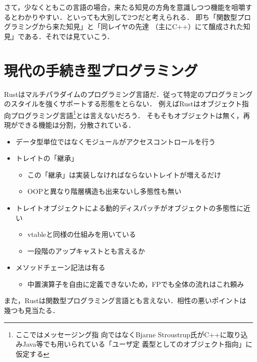 さて，少なくともこの言語の場合，来たる知見の方角を意識しつつ機能を咀嚼するとわかりやすい．といっても大別して2つだと考えられる．
即ち「関数型プログラミングから来た知見」と「同レイヤの先達 （主にC++）にて醸成された知見」である．それでは見ていこう．

\section{現代の手続き型プログラミング}
Rustはマルチパラダイムのプログラミング言語だ．従って特定のプログラミングのスタイルを強くサポートする形態をとらない．
例えばRustはオブジェクト指向プログラミング言語\footnote{ここではメッセージング指
  向ではなくBjarne Stroustrup氏がC++に取り込みJava等でも用いられている「ユーザ定
  義型としてのオブジェクト指向」に仮定する}とは言えないだろう．
そもそもオブジェクトは無く，再現ができる機能は分割，分散されている．
\begin{itemize}
\item データ型単位ではなくモジュールがアクセスコントロールを行う
\item トレイトの「継承」
  \begin{itemize}
  \item この「継承」は実装しなければならないトレイトが増えるだけ
  \item OOPと異なり階層構造も出来ないし多態性も無い
  \end{itemize}
\item トレイトオブジェクトによる動的ディスパッチがオブジェクトの多態性に近い
  \begin{itemize}
  \item vtableと同様の仕組みを用いている
  \item 一段階のアップキャストとも言えるか
  \end{itemize}
\item メソッドチェーン記法は有る
  \begin{itemize}
  \item 中置演算子を自由に定義できないため，FPでも全体の流れはこれ頼み
  \end{itemize}
\end{itemize}
また，Rustは関数型プログラミング言語とも言えない．相性の悪いポイントは幾つも見当たる．
